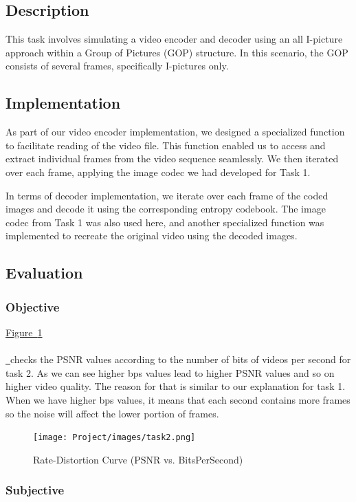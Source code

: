\documentclass{article}
\newcommand*{\figref}[2][]{%
  \hyperref[{fig:#2}]{%
    Figure~\ref*{fig:#2}%
    \ifx\\#1\\%
    \else
      \,#1%
    \fi
  }%
}
\begin{document}
\subsection{Description}

This task involves simulating a video encoder and decoder using an all I-picture approach within a Group of Pictures (GOP) structure. In this scenario, the GOP consists of several frames, specifically I-pictures only.

\subsection{Implementation}

As part of our video encoder implementation, we designed a specialized function to facilitate reading of the video file. This function enabled us to access and extract individual frames from the video sequence seamlessly. We then iterated over each frame, applying the image codec we had developed for Task 1.

In terms of decoder implementation, we iterate over each frame of the coded images and decode it using the corresponding entropy codebook. The image codec from Task 1 was also used here, and another specialized function was implemented to recreate the original video using the decoded images.

\subsection{Evaluation}
\subsubsection{Objective}

\figref{task2} checks the PSNR values according to the number of bits of videos per second for task 2. As we can see higher bps values lead to higher PSNR values and so on higher video quality. The reason for that is similar to our explanation for task 1. When we have higher bps values, it means that each second contains more frames so the noise will affect the lower portion of frames. 

\begin{figure}[H]
  \centering
  \texttt{[image: Project/images/task2.png]}
  \caption{Rate-Distortion Curve (PSNR vs. BitsPerSecond)}
  \label{fig:task2}
\end{figure}

\subsubsection{Subjective}
\end{document}
